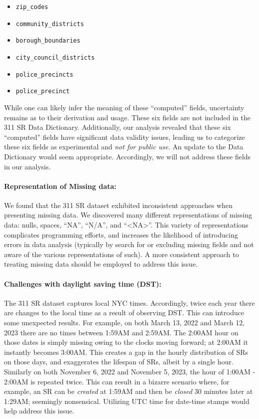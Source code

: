 \documentclass[linenumber]{jdsart}
\begin{document}
\begin{itemize}[left=1.5em]
    \item \texttt{zip\_codes}
    \item \texttt{community\_districts}
    \item \texttt{borough\_boundaries}
    \item \texttt{city\_council\_districts}
    \item \texttt{police\_precincts}
    \item \texttt{police\_precinct}
\end{itemize}

While one can likely infer the meaning of these ``computed'' 
fields, uncertainty remains as to their derivation and 
usage. These six fields are not included in
the 311 SR Data Dictionary. Additionally, our analysis 
revealed that these six ``computed'' fields have 
significant data validity issues, leading us to categorize these six fields 
as experimental and \textit{not for public use}. An update 
to the Data Dictionary would seem appropriate. Accordingly, 
we will not address these fields in our analysis. 

\paragraph{Representation of Missing data:} We found that the 
311 SR dataset exhibited inconsistent approaches when 
presenting missing data. We discovered many different 
representations of missing data: nulls, spaces, ``NA'', ``N/A'', 
and ``<NA>''. This variety of representations complicates programming
efforts, and increases the likelihood of introducing errors 
in data analysis (typically by search for or excluding missing fields 
and not aware of the various representations of such). A more consistent 
approach to treating missing data should be employed to address this issue.

\paragraph{Challenges with daylight saving time (DST):} The 311 SR 
dataset captures local NYC times. Accordingly, twice each 
year there are changes to the local time as a result of observing 
DST. This can introduce some unexpected results. For example, 
on both March 13, 2022 and March 12, 2023 there are no times 
between 1:59AM and 2:59AM. The 2:00AM hour on those dates 
is simply missing owing to the clocks moving forward; at 2:00AM 
it instantly becomes 3:00AM. This creates a gap in the hourly 
distribution of SRs on those days, and exaggerates the 
lifespan of SRs, albeit by a single hour. Similarly on both
November 6, 2022 and November 5, 2023, the 
hour of 1:00AM - 2:00AM is repeated twice. This can result 
in a bizarre scenario where, for example, an SR can 
be \textit{created} at 1:59AM and then be \textit{closed} 30 minutes later 
at 1:29AM; seemingly nonsensical. Utilizing UTC time 
for date-time stamps would help address this issue.
\end{document}
